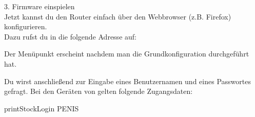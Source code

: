 



{\Large 3. Firmware einspielen} \\

Jetzt kannst du den Router einfach über den Webbrowser (z.B. Firefox) konfigurieren.\\ 
Dazu rufst du in die folgende Adresse auf: \\


Der Menüpunkt  erscheint nachdem man die Grundkonfiguration durchgeführt hat.

Du wirst anschließend zur Eingabe eines Benutzernamen und eines Passwortes gefragt. Bei den Geräten von \printVendor gelten folgende Zugangsdaten: \\

\printStockLogin

\newpage

{\printStockLogin}

\begin{tcolorbox}[colback=red!5!white,colframe=red!75!black,title=My nice heading] 

{\printStockLogin}
printStockLogin
PENIS
\end{tcolorbox}




















